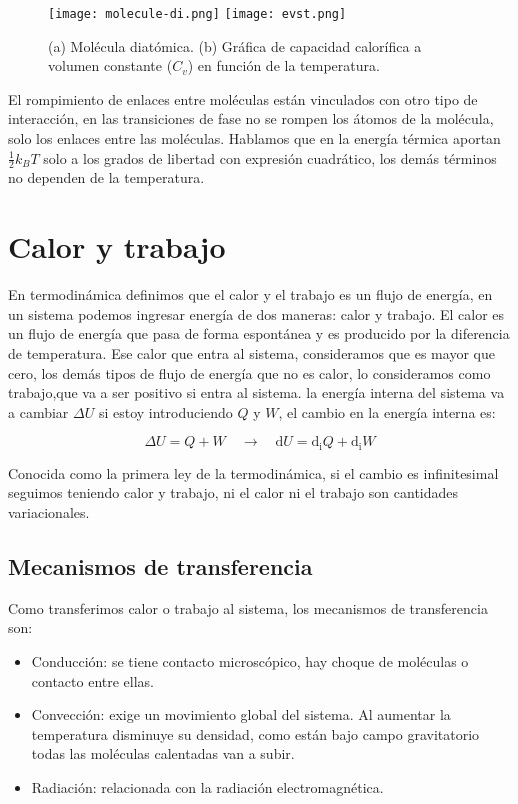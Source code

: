 \documentclass[11pt,fleqn]{book}
\begin{document}
\begin{figure}[H]
    \centering
    \texttt{[image: molecule-di.png]}\hspace{2cm}
    \texttt{[image: evst.png]}
    \caption{(a) Molécula diatómica. (b) Gráfica de capacidad calorífica a volumen constante ($C_{v}$) en función de la temperatura.}
    \label{Fig. 1.4}
\end{figure} 

El rompimiento de enlaces entre moléculas están vinculados con otro tipo de interacción, en las transiciones de fase no se rompen los átomos de la molécula, solo los enlaces entre las moléculas. Hablamos que en la energía térmica aportan $\frac{1}{2}k_{B}T$ solo a los grados de libertad con expresión cuadrático, los demás términos no dependen de la temperatura.

\section{Calor y trabajo}

En termodinámica definimos que el calor y el trabajo es un flujo de energía, en un sistema podemos ingresar energía de dos maneras: calor y trabajo. El calor es un flujo de energía que pasa de forma espontánea y es producido por la diferencia de temperatura. Ese calor que entra al sistema, consideramos que es mayor que cero, los demás tipos de flujo de energía que no es calor, lo consideramos como trabajo,que va a ser positivo si entra al sistema. la energía interna del sistema va a cambiar $\Delta U$ si estoy introduciendo $Q$ y $W$, el cambio en la energía interna es:

\begin{equation}
    \Delta U=Q+W \quad\longrightarrow\quad\mathrm{d}U=\mathrm{d_{i}}Q+\mathrm{d_{i}}W
    \label{Eq. 1.10}
\end{equation}

Conocida como la primera ley de la termodinámica, si el cambio es infinitesimal seguimos teniendo calor y trabajo, ni el calor ni el trabajo son cantidades variacionales.

\subsection{Mecanismos de transferencia}

Como transferimos calor o trabajo al sistema, los mecanismos de transferencia son: 

\begin{itemize}
    \item Conducción: se tiene contacto microscópico, hay choque de moléculas o contacto entre ellas.
    \item  Convección: exige un movimiento global del sistema. Al aumentar la temperatura disminuye su densidad, como están bajo campo gravitatorio todas las moléculas calentadas van a subir.
    \item  Radiación: relacionada con la radiación electromagnética. 
\end{itemize}
\end{document}
